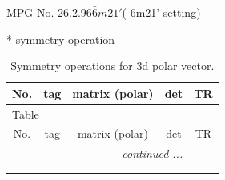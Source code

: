 \documentclass[fleqn,8pt]{jsarticle}
\begin{document}
\setcounter{MaxMatrixCols}{32}

\renewcommand{\tablename}{Table~}
\renewcommand{\figurename}{Figure~}
\begin{center}
\LARGE
MPG No. 26.2.96\quad$\bar{6}m21'$\quad(-6m21' setting)
\end{center}
* symmetry operation
\renewcommand{\arraystretch}{1.3}
\begin{longtable}{ccccc}
\caption{Symmetry operations for 3d polar vector.}
 \\
 \hline \hline
No. & tag & matrix (polar) & det & TR \\ \hline \endfirsthead

\multicolumn{4}{l}{\tablename\ \thetable{}} \\
 \hline \hline
No. & tag & matrix (polar) & det & TR \\ \hline \endhead

 \hline \hline
\multicolumn{4}{r}{\footnotesize\it continued ...} \\ \endfoot

 \hline \hline
\multicolumn{4}{r}{} \\ \endlastfoot


\end{longtable}
\end{document}
